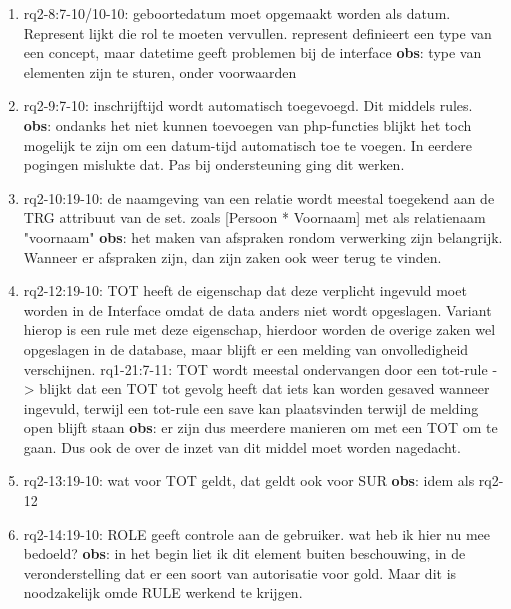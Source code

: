 \begin{enumerate}
    \item rq2-8:7-10/10-10: geboortedatum moet opgemaakt worden als datum. Represent lijkt die rol te moeten vervullen.
    represent definieert een type van een concept, maar datetime geeft problemen bij de interface
    \newline\textbf{obs}: type van elementen zijn te sturen, onder voorwaarden
    
    \item rq2-9:7-10: inschrijftijd wordt automatisch toegevoegd. Dit middels rules.
    \newline\textbf{obs}: ondanks het niet kunnen toevoegen van php-functies blijkt het toch mogelijk te zijn om een datum-tijd automatisch toe te voegen. 
    In eerdere pogingen mislukte dat. 
    Pas bij ondersteuning ging dit werken.
    
    \item rq2-10:19-10: de naamgeving van een relatie wordt meestal toegekend aan de TRG attribuut van de set. zoals [Persoon * Voornaam] met als relatienaam "voornaam"
    \newline\textbf{obs}: het maken van afspraken rondom verwerking zijn belangrijk. Wanneer er afspraken zijn, dan zijn zaken ook weer terug te vinden.
    
    \item rq2-12:19-10: TOT heeft de eigenschap dat deze verplicht ingevuld moet worden in de Interface omdat de data anders niet wordt opgeslagen. Variant hierop is een rule met deze eigenschap, hierdoor worden de overige zaken wel opgeslagen in de database, maar blijft er een melding van onvolledigheid verschijnen.
    \newline rq1-21:7-11: TOT wordt meestal ondervangen door een tot-rule -> blijkt dat een TOT tot gevolg heeft dat iets kan worden gesaved wanneer ingevuld, terwijl een tot-rule een save kan plaatsvinden terwijl de melding open blijft staan
    \newline\textbf{obs}: er zijn dus meerdere manieren om met een TOT om te gaan. Dus ook de over de inzet van dit middel moet worden nagedacht.
    
    \item rq2-13:19-10: wat voor TOT geldt, dat geldt ook voor SUR
    \newline\textbf{obs}:  idem als rq2-12
    
    \item rq2-14:19-10: ROLE geeft controle aan de gebruiker. wat heb ik hier nu mee bedoeld?
    \newline\textbf{obs}: in het begin liet ik dit element buiten beschouwing, in de veronderstelling dat er een soort van autorisatie voor gold. 
    Maar dit is noodzakelijk omde RULE werkend te krijgen.
    

\end{enumerate}
